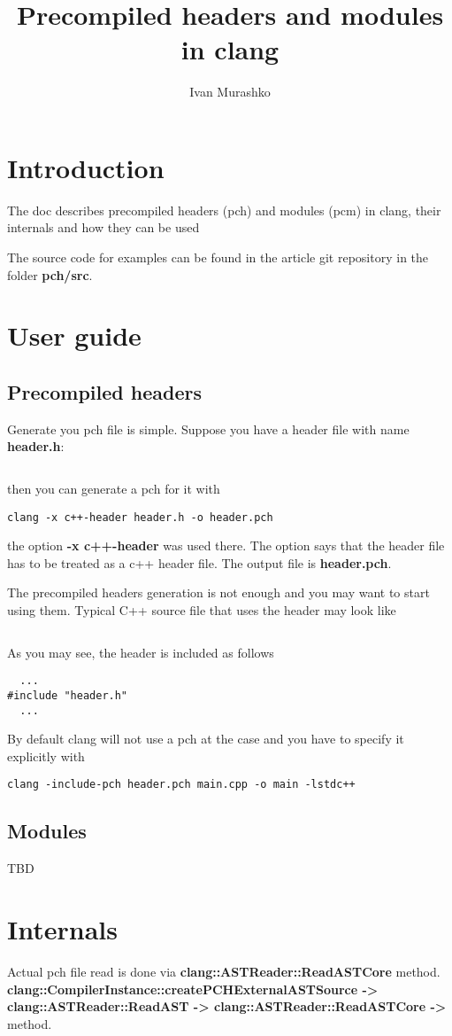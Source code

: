 \documentclass[14pt,a4paper]{article}
\title{Precompiled headers and modules in clang}
\author{Ivan Murashko}
\date{}
\begin{document}
\maketitle
\tableofcontents

\section*{Introduction}
The doc describes precompiled headers (pch) and modules (pcm) in
clang, their internals and how they can be used

The source code for examples can be found in the article git
repository \cite{github:articles_ivanmurashko} in the folder 
\textbf{pch/src}.

\section{User guide}
\subsection{Precompiled headers}
Generate you pch file is simple. Suppose you have a header file with
name \textbf{header.h}:
\inputminted{c++}{./src/simple/header.h} then you can generate a pch for it with
\begin{verbatim}
clang -x c++-header header.h -o header.pch
\end{verbatim}
the option \textbf{-x c++-header} was used there. The option says that
the header file has to be treated as a c++ header file. The output
file is \textbf{header.pch}.

The precompiled headers generation is not enough and you may want to
start using them. Typical C++ source file that uses the header may
look like
\inputminted{c++}{./src/simple/main.cpp}
As you may see, the header is included as follows
\begin{verbatim}
  ...
#include "header.h"
  ...
\end{verbatim}
By default clang will not use a pch at the case and you have to
specify it explicitly with
\begin{verbatim}
clang -include-pch header.pch main.cpp -o main -lstdc++
\end{verbatim}

\subsection{Modules}
TBD

\section{Internals}

Actual pch file read is done via
\textbf{clang::ASTReader::ReadASTCore} method.
\textbf{clang::CompilerInstance::createPCHExternalASTSource ->
  clang::ASTReader::ReadAST -> clang::ASTReader::ReadASTCore -> } method.

  
     
\end{document}
